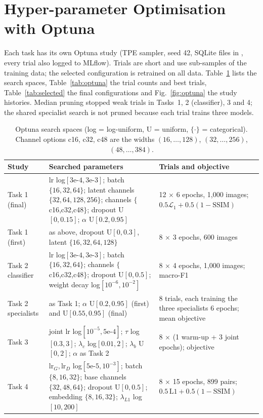 \section{Hyper-parameter Optimisation with Optuna}\label{sec:optuna}
Each task has its own Optuna study (TPE sampler, seed 42, SQLite files in , every trial also logged to MLflow). Trials are short and use sub-samples of the training data; the selected configuration is retrained on all data. Table~\ref{tab:space} lists the search spaces, Table~\ref{tab:optuna} the trial counts and best trials, Table~\ref{tab:selected} the final configurations and Fig.~\ref{fig:optuna} the study histories. Median pruning stopped weak trials in Tasks~1, 2 (classifier), 3 and 4; the shared specialist search is not pruned because each trial trains three models.

\begin{table}[t]
\centering
\caption{Optuna search spaces (log = log-uniform, U = uniform, $\{\cdot\}$ = categorical). Channel options c16, c32, c48 are the widths $(16,\dots,128)$, $(32,\dots,256)$, $(48,\dots,384)$.}\label{tab:space}
\small
\begin{tabular}{p{2.6cm}p{9.2cm}p{4.4cm}}
\toprule
Study & Searched parameters & Trials and objective \\
\midrule
Task 1 (final) & lr log$[3\text{e-}4,3\text{e-}3]$; batch $\{16,32,64\}$; latent channels $\{32,64,128,256\}$; channels $\{$c16,c32,c48$\}$; dropout U$[0,0.15]$; $\alpha$ U$[0.2,0.95]$ & 12 $\times$ 6 epochs, 1,000 images; $0.5\mathcal{L}_1+0.5(1-\mathrm{SSIM})$ \\
Task 1 (first) & as above, dropout U$[0,0.3]$, latent $\{16,32,64,128\}$ & 8 $\times$ 3 epochs, 600 images \\
Task 2 classifier & lr log$[3\text{e-}4,3\text{e-}3]$; batch $\{16,32,64\}$; channels $\{$c16,c32,c48$\}$; dropout U$[0,0.5]$; weight decay log$[10^{-6},10^{-2}]$ & 8 $\times$ 4 epochs, 1,000 images; macro-F1 \\
Task 2 specialists & as Task 1; $\alpha$ U$[0.2,0.95]$ (first) and U$[0.55,0.95]$ (final) & 8 trials, each training the three specialists 6 epochs; mean objective \\
Task 3 & joint lr log$[10^{-5},5\text{e-}4]$; $\tau$ log$[0.3,3]$; $\lambda_c$ log$[0.01,2]$; $\lambda_b$ U$[0,2]$; $\alpha$ as Task 2 & 8 $\times$ (1 warm-up + 3 joint epochs); objective \\
Task 4 & $\mathrm{lr}_G,\mathrm{lr}_D$ log$[5\text{e-}5,10^{-3}]$; batch $\{8,16,32\}$; base channels $\{32,48,64\}$; dropout U$[0,0.5]$; embedding $\{8,16,32\}$; $\lambda_{L1}$ log$[10,200]$ & 8 $\times$ 15 epochs, 899 pairs; $0.5\,\mathrm{L1}+0.5(1-\mathrm{SSIM})$ \\
\bottomrule
\end{tabular}
\end{table}

